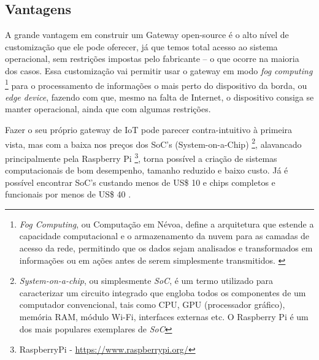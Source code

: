\subsection{Vantagens}
\label{vantagens}
A grande vantagem em construir um Gateway open-source é o alto nível de customização que ele pode oferecer, já que temos total acesso ao sistema operacional, sem restrições impostas pelo fabricante – o que ocorre na maioria dos casos. Essa customização vai permitir usar o gateway em modo \textit{fog computing} \footnote{\textit{Fog Computing}, ou Computação em Névoa, define a arquitetura que estende a capacidade computacional e o armazenamento da nuvem para as camadas de acesso da rede, permitindo que os dados sejam analisados e transformados em informações ou em ações antes de serem simplesmente transmitidos. \cite{CIOIDG}} para o processamento de informações o mais perto do dispositivo da borda, ou \textit{edge device}, fazendo com que, mesmo na falta de Internet, o dispositivo consiga se manter operacional, ainda que com algumas restrições.

Fazer o seu próprio gateway de IoT pode parecer contra-intuitivo à primeira vista, mas com a baixa nos preços dos SoC’s (System-on-a-Chip) \footnote{\textit{System-on-a-chip}, ou simplesmente \textit{SoC}, é um termo utilizado para caracterizar um circuito integrado que engloba todos os componentes de um computador convencional, tais como CPU, GPU (processador gráfico), memória RAM, módulo Wi-Fi, interfaces externas etc. O Raspberry Pi é um dos mais populares exemplares de \textit{SoC}}, alavancado principalmente pela Raspberry Pi \footnote{RaspberryPi - \url{https://www.raspberrypi.org/}}, torna possível a criação de sistemas computacionais de bom desempenho, tamanho reduzido e baixo custo. Já é possível encontrar SoC’s custando menos de US\$ 10 e chips completos e funcionais por menos de US\$ 40 \cite{RaspberryPiVenda}.